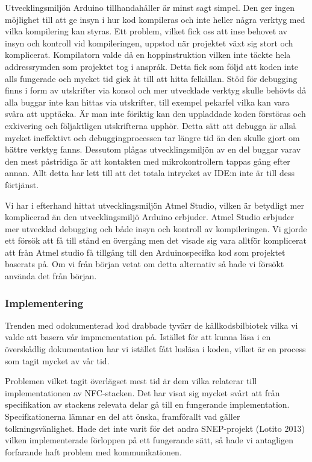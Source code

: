 \documentclass[11pt]{article}
\begin{document}
Utvecklingsmiljön Arduino tillhandahåller är minst sagt simpel. Den ger ingen möjlighet till att ge insyn i hur kod kompileras och inte heller några verktyg med vilka kompilering kan styras. Ett problem, vilket fick oss att inse behovet av insyn och kontroll vid kompileringen, uppstod när projektet växt sig stort och komplicerat. Kompilatorn valde då en hoppinstruktion vilken inte täckte hela addressrymden som projektet tog i anspråk. Detta fick som följd att koden inte alls fungerade och mycket tid gick åt till att hitta felkällan. Stöd för debugging finns i form av utskrifter via konsol och mer utvecklade verktyg skulle behövts då alla buggar inte kan hittas via utskrifter, till exempel pekarfel vilka kan vara svåra att upptäcka. Är man inte föriktig kan den uppladdade koden förstöras och exkivering och följaktligen utskrifterna upphör. Detta sätt att debugga är allså mycket ineffektivt och debuggingprocessen tar längre tid än den skulle gjort om bättre verktyg fanns. Dessutom plågas utvecklingsmiljön av en del buggar varav den mest påstridiga är att kontakten med mikrokontrollern tappas gång efter annan. Allt detta har lett till att det totala intrycket av IDE:n inte är till dess förtjänst.

Vi har i efterhand hittat utvecklingsmiljön Atmel Studio, vilken är betydligt mer komplicerad än den utvecklingsmiljö Arduino erbjuder. Atmel Studio erbjuder mer utvecklad debugging och både insyn och kontroll av kompileringen. Vi gjorde ett försök att få till stånd en övergång men det visade sig vara alltför komplicerat att från Atmel studio få tillgång till den Arduinospecifka kod som projektet baserats på. Om vi från början vetat om detta alternativ så hade vi försökt använda det från början.

\subsubsection{Implementering}
Trenden med odokumenterad kod drabbade tyvärr de källkodsbilbiotek vilka vi valde att basera vår impmementation på. Istället för att kunna läsa i en överskådlig dokumentation har vi istället fått lusläsa i koden, vilket är en process som tagit mycket av vår tid.

Problemen vilket tagit överlägset mest tid är dem vilka relaterar till implementationen av NFC-stacken. Det har visat sig mycket svårt att från specifikation av stackens relevata delar gå till en fungerande implementation. Specifkationerna lämnar en del att önska, framförallt vad gäller tolkningsvänlighet. Hade det inte varit för det andra SNEP-projekt (Lotito 2013) vilken implementerade förloppen på ett fungerande sätt, så hade vi antagligen forfarande haft problem med kommunikationen.
\end{document}
